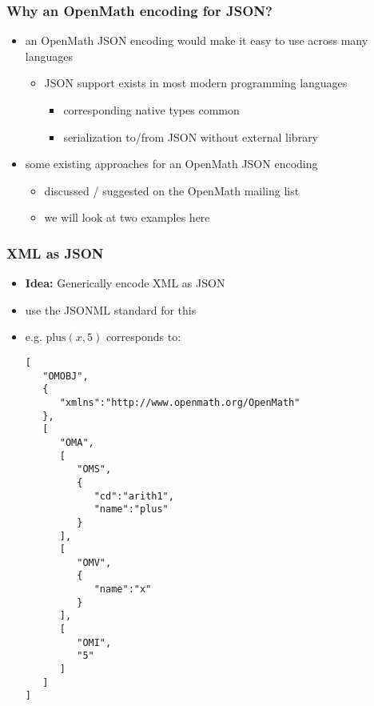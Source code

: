 \documentclass[usenames,dvipsnames]{beamer}
\begin{document}
\begin{frame}
    \frametitle{Why an OpenMath encoding for JSON?}
    \begin{itemize}
        \item an OpenMath JSON encoding would make it easy to use across many languages
        \begin{itemize}
            \item JSON support exists in most modern programming languages
            \begin{itemize}
                \item corresponding native types common
                \item serialization to/from JSON without external library
            \end{itemize}
        \end{itemize}
        \item some existing approaches for an OpenMath JSON encoding
        \begin{itemize}
            \item discussed / suggested on the OpenMath mailing list
            \item we will look at two examples here
        \end{itemize}
    \end{itemize}
\end{frame}

\begin{frame}[fragile]
    \frametitle{XML as JSON}
    \begin{itemize}
        \item \textbf{Idea:} Generically encode XML as JSON
        \item use the JSONML standard for this%
        \item e.g. $\mathrm{plus}(x, 5)$ corresponds to:
        \begin{lstlisting}
[  
   "OMOBJ",
   {  
      "xmlns":"http://www.openmath.org/OpenMath"
   },
   [  
      "OMA",
      [  
         "OMS",
         {  
            "cd":"arith1",
            "name":"plus"
         }
      ],
      [  
         "OMV",
         {  
            "name":"x"
         }
      ],
      [  
         "OMI",
         "5"
      ]
   ]
]
\end{lstlisting}
    \end{itemize}
\end{frame}
\end{document}
